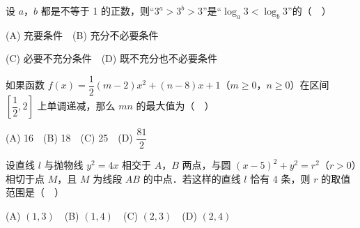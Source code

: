 \begin{question}
设 \(a\)，\(b\) 都是不等于 1 的正数，则“\(3^a>3^b>3\)”是“\(\log_a 3<\log_b 3\)”的（　）

(A) 充要条件　(B) 充分不必要条件

(C) 必要不充分条件　(D) 既不充分也不必要条件

\end{question}
\begin{question}
如果函数 \(f(x)=\dfrac{1}{2}(m-2)x^2+(n-8)x+1\)（\(m\geqslant 0\)，\(n\geqslant 0\)）在区间 \(\left[\dfrac{1}{2},2\right]\) 上单调递减，那么 \(mn\) 的最大值为（　）

(A) 16　(B) 18　(C) 25　(D) \(\dfrac{81}{2}\)

\end{question}
\begin{question}
设直线 \(l\) 与抛物线 \(y^2=4x\) 相交于 \(A\)，\(B\) 两点，与圆 \((x-5)^2+y^2=r^2\)（\(r>0\)）相切于点 \(M\)，且 \(M\) 为线段 \(AB\) 的中点．若这样的直线 \(l\) 恰有 4 条，则 \(r\) 的取值范围是（　）

(A) \((1,3)\)　(B) \((1,4)\)　(C) \((2,3)\)　(D) \((2,4)\)

\end{question}

